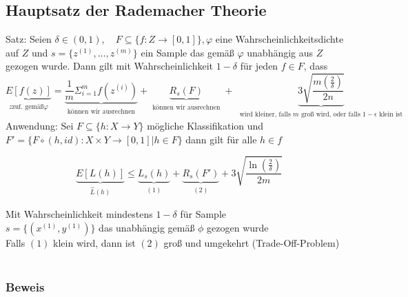 \subsection*{Hauptsatz der Rademacher Theorie}
Satz: Seien $\delta \in (0,1), \quad F \subseteq \{f: Z \rightarrow [0,1]\}, \varphi$ eine Wahrscheinlichkeitsdichte auf $Z$ und $s= \{z^{(1)}, \dots , z^{(m)}\}$ ein Sample das gemäß $\varphi$ unabhängig aus $Z$ gezogen wurde. Dann gilt mit Wahrscheinlichkeit $1-\delta$ für jeden $f \in F$, dass
\[\underbrace{E[f(z)]}_{\substack{z \text{zuf. gemäß} \varphi}} = \underbrace{\frac{1}{m} \Sigma^m_{i=1} f(z^{(i)})}_{\substack{\text{können wir ausrechnen}}} + \underbrace{R_s(F)}_{\substack{\text{können wir ausrechnen}}} + \underbrace{3 \sqrt{\frac{m(\frac{2}{\delta})}{2n}}}_{\substack{\text{ wird kleiner, falls }  m \text{ groß wird, oder falls } 1-\epsilon\text{ klein ist }}}\]
Anwendung: Sei $F \subseteq \{h: X \rightarrow Y\}$ mögliche Klassifikation und $F' = \{F \circ (h, id): X \times Y \rightarrow [0,1] | h \in F\}$ dann gilt für alle $h \in f$
\begin{framed}
\[ \underbrace{E[L(h)]}_{\substack{\hat{L}(h)}} \leq \underbrace{L_s(h)}_{\substack{(1)}} + \underbrace{R_s(F')}_{\substack{(2)}} +3\sqrt{\frac{\ln (\frac{2}{\delta})}{2m}}\]
\end{framed}
Mit Wahrscheinlichkeit mindestens $1-\delta$ für Sample\\
$s = \{(x^{(1)},y^{(1)})\}$ das unabhängig gemäß $\phi$ gezogen wurde\\
Falls $(1)$ klein wird, dann ist $(2)$ groß und umgekehrt (Trade-Off-Problem)\\\\
\subsubsection*{Beweis}